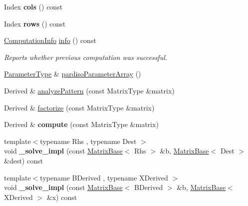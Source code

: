 \begin{DoxyCompactItemize}
\item 
\mbox{\label{class_eigen_1_1_pardiso_impl_a52a56fde447df457c27f808ae81857a6}} 
Index {\bfseries cols} () const
\item 
\mbox{\label{class_eigen_1_1_pardiso_impl_a4da5aaafb4964daee9855b897ebc3a4b}} 
Index {\bfseries rows} () const
\item 
\mbox{\hyperlink{group__enums_ga85fad7b87587764e5cf6b513a9e0ee5e}{Computation\+Info}} \mbox{\hyperlink{class_eigen_1_1_pardiso_impl_a7dce1175518593e33d32e30ab0ffee3b}{info}} () const
\begin{DoxyCompactList}\small\item\em Reports whether previous computation was successful. \end{DoxyCompactList}\item 
\mbox{\hyperlink{class_eigen_1_1_array}{Parameter\+Type}} \& \mbox{\hyperlink{class_eigen_1_1_pardiso_impl_a42a7983796076edc52e0e8d2869610ec}{pardiso\+Parameter\+Array}} ()
\item 
Derived \& \mbox{\hyperlink{class_eigen_1_1_pardiso_impl_af1773ce06014b55a69cd42daf34eeec4}{analyze\+Pattern}} (const Matrix\+Type \&matrix)
\item 
Derived \& \mbox{\hyperlink{class_eigen_1_1_pardiso_impl_a6a4c092c5fb581a946d3c4e5ec347dfb}{factorize}} (const Matrix\+Type \&matrix)
\item 
\mbox{\label{class_eigen_1_1_pardiso_impl_a01d51b4c6a2aa4d269f77d9f12ab8c34}} 
Derived \& {\bfseries compute} (const Matrix\+Type \&matrix)
\item 
\mbox{\label{class_eigen_1_1_pardiso_impl_a1735d09abb438a282ddca4c5bd05d993}} 
{\footnotesize template$<$typename Rhs , typename Dest $>$ }\\void {\bfseries \+\_\+solve\+\_\+impl} (const \mbox{\hyperlink{class_eigen_1_1_matrix_base}{Matrix\+Base}}$<$ Rhs $>$ \&b, \mbox{\hyperlink{class_eigen_1_1_matrix_base}{Matrix\+Base}}$<$ Dest $>$ \&dest) const
\item 
\mbox{\label{class_eigen_1_1_pardiso_impl_a5bc3793e432180b0e990bb8fedcb302d}} 
{\footnotesize template$<$typename B\+Derived , typename X\+Derived $>$ }\\void {\bfseries \+\_\+solve\+\_\+impl} (const \mbox{\hyperlink{class_eigen_1_1_matrix_base}{Matrix\+Base}}$<$ B\+Derived $>$ \&b, \mbox{\hyperlink{class_eigen_1_1_matrix_base}{Matrix\+Base}}$<$ X\+Derived $>$ \&x) const

\end{DoxyCompactItemize}
